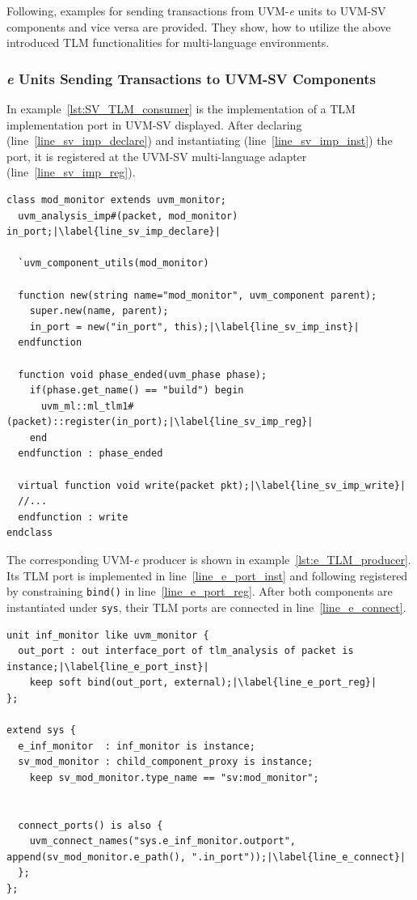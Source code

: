 Following, examples for sending transactions from UVM-\textit{e} units to UVM-SV components and
vice versa are provided. They show, how to utilize the above introduced TLM functionalities for multi-language
environments.
\subsubsection{\textit{e} Units Sending Transactions to UVM-SV Components}
In example~\ref{lst:SV_TLM_consumer} is the implementation of a TLM implementation port in UVM-SV
displayed. After declaring (line~\ref{line_sv_imp_declare}) and instantiating (line~\ref{line_sv_imp_inst}) the port, it
is registered at the UVM-SV multi-language adapter (line~\ref{line_sv_imp_reg}).
\lstset{language=SystemVerilog, numbers = left, escapechar=|, breaklines=true}
\begin{lstlisting}[frame=htrbl, caption={SystemVerilog: consumer side of a TLM connection},
label={lst:SV_TLM_consumer}]
class mod_monitor extends uvm_monitor;
  uvm_analysis_imp#(packet, mod_monitor) in_port;|\label{line_sv_imp_declare}|
  
  `uvm_component_utils(mod_monitor)
  
  function new(string name="mod_monitor", uvm_component parent);
    super.new(name, parent);
    in_port = new("in_port", this);|\label{line_sv_imp_inst}|
  endfunction 
  
  function void phase_ended(uvm_phase phase);
    if(phase.get_name() == "build") begin
      uvm_ml::ml_tlm1#(packet)::register(in_port);|\label{line_sv_imp_reg}|
    end
  endfunction : phase_ended
  
  virtual function void write(packet pkt);|\label{line_sv_imp_write}|
  //...
  endfunction : write
endclass
\end{lstlisting}
The corresponding UVM-\textit{e} producer is shown in example~\ref{lst:e_TLM_producer}. Its TLM port is implemented in
line~\ref{line_e_port_inst} and following registered by constraining \lstinline$bind()$ in line~\ref{line_e_port_reg}.
After both components are instantiated under \lstinline$sys$, their TLM ports are connected in line~\ref{line_e_connect}.
\lstset{language=e, numbers = left, escapechar=|, breaklines=true}
\begin{lstlisting}[frame=htrbl, caption={\textit{e}: producer side of a TLM connection},
label={lst:e_TLM_producer}]
unit inf_monitor like uvm_monitor {
  out_port : out interface_port of tlm_analysis of packet is instance;|\label{line_e_port_inst}|
    keep soft bind(out_port, external);|\label{line_e_port_reg}|
};

extend sys {
  e_inf_monitor  : inf_monitor is instance;
  sv_mod_monitor : child_component_proxy is instance;
    keep sv_mod_monitor.type_name == "sv:mod_monitor";
  
    
  connect_ports() is also {
    uvm_connect_names("sys.e_inf_monitor.outport", append(sv_mod_monitor.e_path(), ".in_port"));|\label{line_e_connect}|
  };  
};
\end{lstlisting}

